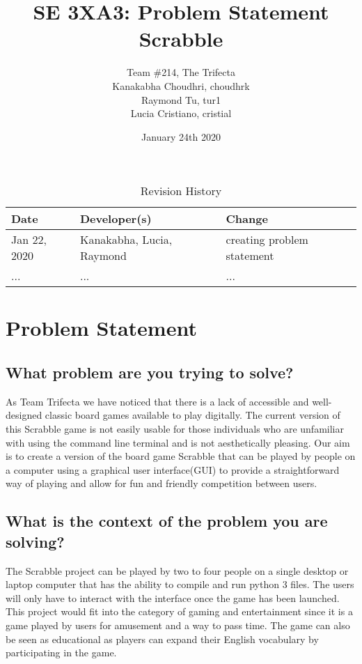 \documentclass{article}
\title{SE 3XA3: Problem Statement\\ Scrabble}
\author{Team \#214, The Trifecta
		\\ Kanakabha Choudhri, choudhrk
		\\ Raymond Tu, tur1
		\\ Lucia Cristiano, cristial
}
\date{January 24th 2020}
\begin{document}
\begin{table}[hp]
\caption{Revision History} \label{TblRevisionHistory}
\begin{tabularx}{\textwidth}{llX}
\toprule
\textbf{Date} & \textbf{Developer(s)} & \textbf{Change}\\
\midrule
Jan 22, 2020 & Kanakabha, Lucia, Raymond & creating problem statement\\
... & ... & ...\\
\bottomrule
\end{tabularx}
\end{table}

\newpage

\maketitle

\section*{Problem Statement}
\subsection*{What problem are you trying to solve?}

As Team Trifecta we have noticed that there is a lack of accessible and well-designed classic board games available to play digitally. The current version of this Scrabble game is not easily usable for those individuals who are unfamiliar with using the command line terminal and is not aesthetically pleasing. Our aim is to create a version of the board game Scrabble that can be played by people on a computer using a graphical user interface(GUI) to provide a straightforward way of playing and allow for fun and friendly competition between users.\\

\subsection*{What is the context of the problem you are solving?}

The Scrabble project can be played by two to four people on a single desktop or laptop computer that has the ability to compile and run python 3 files. The users will only have to interact with the interface once the game has been launched. This project would fit into the category of gaming and entertainment since it is a game played by users for amusement and a way to pass time. The game can also be seen as educational as players can expand their English vocabulary by participating in the game. \\
\end{document}
